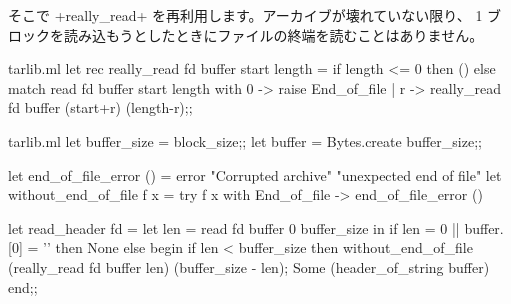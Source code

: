 そこで \ml+really_read+ を再利用します。アーカイブが壊れていない限り、
1 ブロックを読み込もうとしたときにファイルの終端を読むことはありません。
%
\begin{codefile}{tarlib.ml}
let rec really_read fd buffer start length =
  if length <= 0 then () else
    match read fd buffer start length with
      0 -> raise End_of_file
    | r -> really_read fd buffer (start+r) (length-r);;
\end{codefile}
%
\begin{listingcodefile}{tarlib.ml}
let buffer_size = block_size;;
let buffer = Bytes.create buffer_size;;

let end_of_file_error () =
  error "Corrupted archive" "unexpected end of file"
let without_end_of_file f x =
  try f x with End_of_file -> end_of_file_error ()

let read_header fd =
  let len = read fd buffer 0 buffer_size in
  if len = 0 ||  buffer.[0] = '' then None
  else begin
    if len < buffer_size then
      without_end_of_file (really_read fd buffer len) (buffer_size - len);
    Some (header_of_string buffer)
  end;;
\end{listingcodefile}

